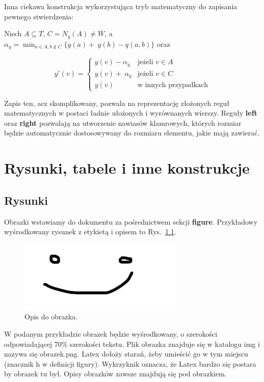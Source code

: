 \documentclass[twoside,a4paper]{book}
\begin{document}
Inna ciekawa konstrukcja wykorzystująca tryb matematyczny do zapisania pewnego stwierdzenia:

Niech $A \subseteq T$, $C = N_y(A) \neq W$, a~$\alpha_y = \min_{a \in A, b\notin C} \{y(a) +~y(b) - q(a, b)\}$ oraz

\[ y'(v) = \left\{ \begin{array}{ll}
                y(v) - \alpha_y & \mbox{jeżeli $v \in A$} \\
                y(v) +~\alpha_y & \mbox{jeżeli $v \in C$} \\
                y(v)            & \mbox{w innych przypadkach}
               \end{array}
       \right. \]

Zapis ten, acz skomplikowany, pozwala na reprezentację złożonych reguł matematycznych w postaci ładnie ułożonych i wyrównanych wierszy. Reguły \textbf{left} oraz \textbf{right} pozwalają na utworzenie nawiasów klamrowych, których rozmiar będzie automatycznie dostosowywany do rozmiaru elementu, jakie mają zawierać.

\chapter{Rysunki, tabele i inne konstrukcje}
\enlargethispage{20pt}
\section{Rysunki}
\label{rysunki}
Obrazki wstawiamy do dokumentu za pośrednictwem sekcji \textbf{figure}. Przykładowy wyśrodkowany rysunek z etykietą i opisem to Rys.~\ref{fig:obrazek}.

\begin{figure}[!h]
\centering
\includegraphics[width=0.7\textwidth]{img/obrazek.png}
\caption{Opis do obrazka.}
\label{fig:obrazek}
\end{figure}

W podanym przykładzie obrazek będzie wyśrodkowany, o szerokości odpowiadającej 70\% szerokości tekstu. Plik obrazka znajduje się w katalogu img i nazywa się obrazek.png. Latex dołoży starań, żeby umieścić go w tym miejscu (znacznik h w definicji figury). Wykrzyknik oznacza, że Latex bardzo się postara by obrazek tu był. Opisy obrazków zawsze znajdują się pod obrazkiem.
\end{document}
